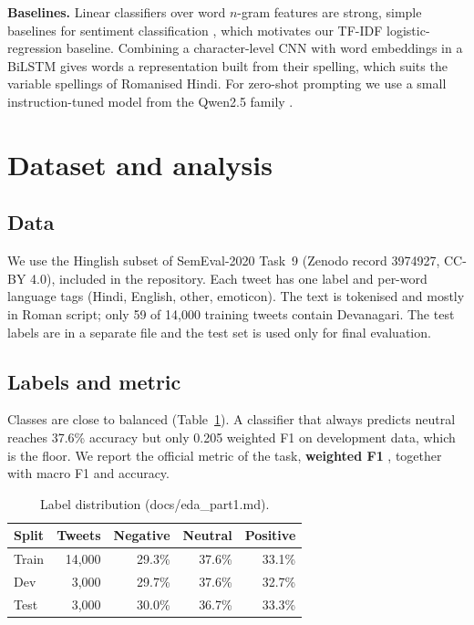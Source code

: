 \textbf{Baselines.} Linear classifiers over word $n$-gram features are strong, simple baselines for sentiment
classification \cite{wang2012}, which motivates our TF-IDF logistic-regression baseline. Combining a character-level CNN
with word embeddings in a BiLSTM \cite{ma2016} gives words a representation built from their spelling, which suits the
variable spellings of Romanised Hindi. For zero-shot prompting we use a small instruction-tuned model from the Qwen2.5
family \cite{qwen2024}.

\section{Dataset and analysis}
\subsection{Data}
We use the Hinglish subset of SemEval-2020 Task~9 \cite{patwa2020} (Zenodo record 3974927, CC-BY 4.0), included in the
repository. Each tweet has one label and per-word language tags (Hindi, English, other, emoticon). The text is tokenised
and mostly in Roman script; only 59 of 14{,}000 training tweets contain Devanagari. The test labels are in a separate
file and the test set is used only for final evaluation.

\subsection{Labels and metric}
Classes are close to balanced (Table~\ref{tab:labels}). A classifier that always predicts neutral reaches 37.6\%
accuracy but only 0.205 weighted F1 on development data, which is the floor. We report the official metric of the
task, \textbf{weighted F1} \cite{patwa2020}, together with macro F1 and accuracy.

\begin{table}[h]
\centering
\begin{tabular}{lrrrr}
\hline
Split & Tweets & Negative & Neutral & Positive \\
\hline
Train & 14{,}000 & 29.3\% & 37.6\% & 33.1\% \\
Dev   & 3{,}000  & 29.7\% & 37.6\% & 32.7\% \\
Test  & 3{,}000  & 30.0\% & 36.7\% & 33.3\% \\
\hline
\end{tabular}
\caption{Label distribution (docs/eda\_part1.md).}
\label{tab:labels}
\end{table}

